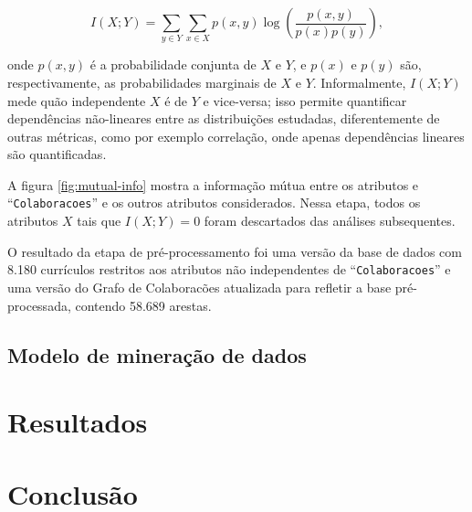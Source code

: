 \documentclass[12pt]{article}
\begin{document}
\begin{equation}
  I(X; Y) = \sum_{y \in Y} \sum_{x \in X} p(x, y) \log \left( \frac{p(x, y)}{p(x)p(y)} \right),
\end{equation}

onde $p(x, y)$ é a probabilidade conjunta de $X$ e $Y$, e $p(x)$ e $p(y)$ são, respectivamente, as probabilidades marginais de $X$ e $Y$.
Informalmente, $I(X; Y)$ mede quão independente $X$ é de $Y$ e vice-versa; isso permite quantificar dependências não-lineares entre as distribuições estudadas, diferentemente de outras métricas, como por exemplo correlação, onde apenas dependências lineares são quantificadas.

A figura \ref{fig:mutual-info} mostra a informação mútua entre os atributos e ``\texttt{Colaboracoes}'' e os outros atributos considerados.
Nessa etapa, todos os atributos $X$ tais que $I(X; Y) = 0$ foram descartados das análises subsequentes.

O resultado da etapa de pré-processamento foi uma versão da base de dados com 8.180 currículos restritos aos atributos não independentes de ``\texttt{Colaboracoes}'' e uma versão do Grafo de Colaboracões atualizada para refletir a base pré-processada, contendo 58.689 arestas.

\subsection{Modelo de mineração de dados}
\label{sec:datamine}

\section{Resultados}
\label{sec:results}

\section{Conclusão}
\label{sec:conclusion}



\end{document}
